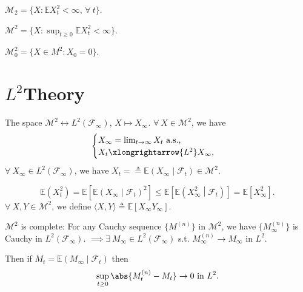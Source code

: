 
$\mathcal{M}_2 = \{X\colon\mathbb{E} X_t^2 <\infty,\, \forall~ t\}$.

$\mathcal{M}^2 = \{X\colon \sup_{t \geq 0} \mathbb{E}X_t^2 < \infty\}$.

$\mathcal{M}^2_0 = \{X \in M^2 \colon X_0 = 0\}$.


\section{\texorpdfstring{$L^2$}-Theory}
The space $\mathcal{M}^2 \longleftrightarrow L^2(\mathcal{F}_{\infty})$, $X \mapsto X_{\infty}$. $\forall~ X \in \mathcal{M}^2$, we have 
$$
\begin{cases}
    X_{\infty} = \lim_{t \to \infty} X_t \text{ a.s.,}\\
    X_t \xlongrightarrow{L^2} X_{\infty},
\end{cases}
$$
$\forall~ X_\infty \in L^2(\mathcal{F}_{\infty})$, we have $X_{t} = \triangleq \mathbb{E}\left( X_\infty \middle| \mathcal{F}_{t} \right) \in \mathcal{M}^2.$

$$
\mathbb{E}\left( X_t^2 \right) = \mathbb{E}\left[ \mathbb{E}\left( X_\infty \middle| \mathcal{F}_t \right)^2 \right] \leq \mathbb{E}\left[ \mathbb{E}\left( X_\infty^2 \middle| \mathcal{F}_t \right) \right] = \mathbb{E}[X_\infty^2].
$$
$\forall~ X,Y \in \mathcal{M}^2$, we define $\langle X,Y \rangle \triangleq \mathbb{E}\left[ X_{\infty}Y_{\infty} \right]. $


$\mathcal{M}^2$ is complete: For any Cauchy sequence $\{M^{(n)}\}$ in $\mathcal{M}^2$, we have $\{M_{\infty}^{(n)}\}$ is Cauchy in $L^2(\mathcal{F}_{\infty})$. $\implies\exists~M_{\infty} \in L^2(\mathcal{F}_{\infty})$ s.t. $M_{\infty}^{(n)} \to M_{\infty}$ in $L^2$.

Then if $M_t = \mathbb{E}(M_\infty \mid\mathcal{F}_t)$ then
$$
    \sup_{t \geq 0}\abs{ M_t^{(n)} - M_t } \to 0 \text{ in } L^2.
$$

